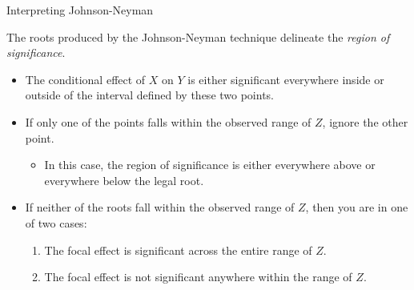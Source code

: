 \documentclass{beamer}\usepackage[]{graphicx}\usepackage[]{color}
\begin{document}
\watermarkon %

\begin{frame}{Interpreting Johnson-Neyman}
  
  The roots produced by the Johnson-Neyman technique delineate the
  \emph{region of significance}.  
  \vb
  \begin{itemize}
  \item The conditional effect of $X$ on $Y$ is either significant everywhere 
    inside or outside of the interval defined by these two points.  
    \vb
  \item If only one of the points falls within the observed range of $Z$, ignore 
    the other point. 
    \vc
    \begin{itemize}
    \item In this case, the region of significance is either everywhere above or 
      everywhere below the legal root.
    \end{itemize}
    \vb
  \item If neither of the roots fall within the observed range of $Z$, then you 
    are in one of two cases:
    \vc
    \begin{enumerate}
    \item The focal effect is significant across the entire range of $Z$. 
      \vc
    \item The focal effect is not significant anywhere within the range of $Z$.
    \end{enumerate}
  \end{itemize}
  
\end{frame}

\watermarkoff %
\end{document}

